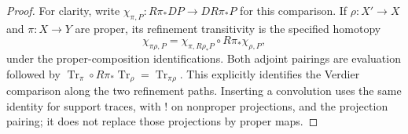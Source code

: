 \documentclass[11pt]{article}
\theoremstyle{definition}
\theoremstyle{remark}
\begin{document}
\begin{proof}
For clarity, write $\chi_{\pi,P}:R\pi_*DP\to D R\pi_*P$ for
this comparison.  If $\rho:X'\to X$ and $\pi:X\to Y$ are proper,
its refinement transitivity is the specified homotopy
\begin{equation}
 \chi_{\pi\rho,P}
   =\chi_{\pi,R\rho_*P}\circ R\pi_*\chi_{\rho,P},
 \label{eq:trace-transitivity}
\end{equation}
under the proper-composition identifications.  Both adjoint pairings
are evaluation followed by
$\operatorname{Tr}_{\pi}\circ R\pi_*\operatorname{Tr}_{\rho}
=\operatorname{Tr}_{\pi\rho}$.  This explicitly identifies the
Verdier comparison along the two refinement paths.  Inserting a
convolution uses the same identity for support traces, with $!$ on
nonproper projections, and the projection pairing; it does not
replace those projections by proper maps.
\end{proof}
\end{document}
